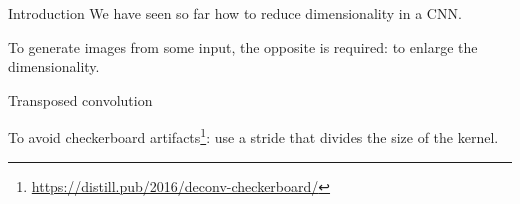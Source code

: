 \begin{frame}{Introduction}
  We have seen so far how to reduce dimensionality in a CNN.

  To generate images from some input, the opposite is required: to enlarge the dimensionality.
\end{frame}

\begin{frame}{Transposed convolution}

  To avoid checkerboard artifacts\footnote[frame]{\url{https://distill.pub/2016/deconv-checkerboard/}}: use a stride that divides the size of the kernel.
\end{frame}
